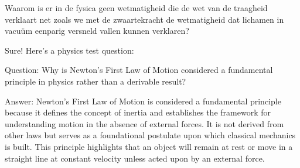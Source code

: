 

\item{}Waarom is er in de fysica geen wetmatigheid die de wet van de traagheid verklaart net zoals we met de zwaartekracht de wetmatigheid dat lichamen in vacu\"um eenparig versneld vallen kunnen verklaren?

\begin{oplossing}
Sure! Here’s a physics test question:

Question:
Why is Newton’s First Law of Motion considered a fundamental principle in physics rather than a derivable result?

Answer:
Newton’s First Law of Motion is considered a fundamental principle because it defines the concept of inertia and establishes the framework for understanding motion in the absence of external forces. It is not derived from other laws but serves as a foundational postulate upon which classical mechanics is built. This principle highlights that an object will remain at rest or move in a straight line at constant velocity unless acted upon by an external force.

\end{oplossing}